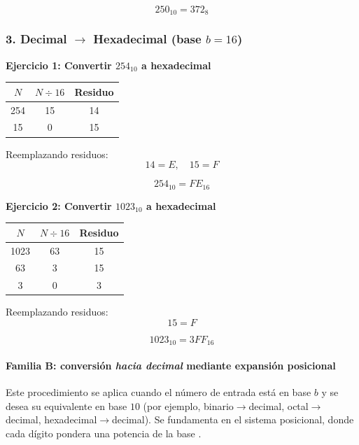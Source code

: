 \documentclass[12pt,twoside]{book}
\begin{document}
						\[
						250_{10} = 372_8
						\]
						
						\subsubsection*{3. Decimal $\rightarrow$ Hexadecimal (base $b=16$)}
						
						\noindent
						\textbf{Ejercicio 1: Convertir $254_{10}$ a hexadecimal}
						
						\begin{center}
							\begin{tabular}{c|c|c}
								$N$ & $N \div 16$ & Residuo \\
								\hline
								254 & 15 & 14 \\
								15  & 0  & 15 \\
							\end{tabular}
						\end{center}
						
						Reemplazando residuos:
						\[
						14 = E, \quad 15 = F
						\]
						
						\[
						254_{10} = FE_{16}
						\]
						
						\noindent
						\textbf{Ejercicio 2: Convertir $1023_{10}$ a hexadecimal}
						
						\begin{center}
							\begin{tabular}{c|c|c}
								$N$ & $N \div 16$ & Residuo \\
								\hline
								1023 & 63 & 15 \\
								63   & 3  & 15 \\
								3    & 0  & 3 \\
							\end{tabular}
						\end{center}
						
						Reemplazando residuos:
						\[
						15 = F
						\]
						
						\[
						1023_{10} = 3FF_{16}
						\]
						
						\paragraph{Familia B: conversión \emph{hacia decimal} mediante expansión posicional}
						Este procedimiento se aplica cuando el número de entrada está en base $b$ y se desea su equivalente en base $10$ (por ejemplo, binario$\rightarrow$decimal, octal$\rightarrow$decimal, hexadecimal$\rightarrow$decimal). Se fundamenta en el sistema posicional, donde cada dígito pondera una potencia de la base \cite{Wirth1976Algorithms,Tanenbaum2021Structured,Manzano2017Programacion}.
						
\end{document}
